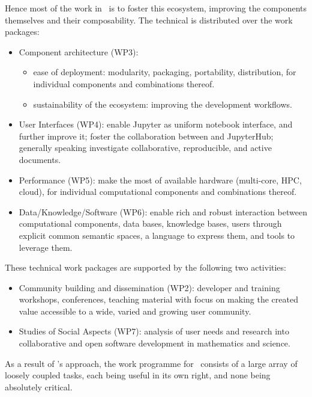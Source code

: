 \documentclass{deliverablereport}
\begin{document}
Hence most of the work in \ODK\ is to foster this ecosystem, improving
the components themselves and their composability. The technical is
distributed over the work packages:
\begin{itemize}
\item Component architecture (WP3):
  \begin{itemize}
  \item ease of deployment: modularity, packaging, portability,
    distribution, for individual components and combinations thereof.
  \item sustainability of the ecosystem: improving the development workflows.
  \end{itemize}
\item User Interfaces (WP4): enable Jupyter as uniform notebook
  interface, and further improve it; foster the collaboration between
  \cocalc and JupyterHub; generally speaking investigate
  collaborative, reproducible, and active documents.
\item Performance (WP5): make the most of available hardware
  (multi-core, HPC, cloud), for individual computational components and
  combinations thereof.
\item Data/Knowledge/Software (WP6): enable rich and robust
  interaction between computational components, data bases, knowledge
  bases, users through explicit common semantic spaces, a language to
  express them, and tools to leverage them.
\end{itemize}
These technical work packages are supported by the following two activities:
\begin{itemize}
\item Community building and dissemination (WP2): developer and
  training workshops, conferences, teaching material with focus on
  making the created value accessible to a wide, varied and growing user community.
\item Studies of Social Aspects (WP7): analysis of user needs and
  research into collaborative and open software development in
  mathematics and science.
\end{itemize}

As a result of \ODK's approach, the work programme for \ODK\ consists
of a large array of loosely coupled tasks, each being useful in its
own right, and none being absolutely critical.
\end{document}
